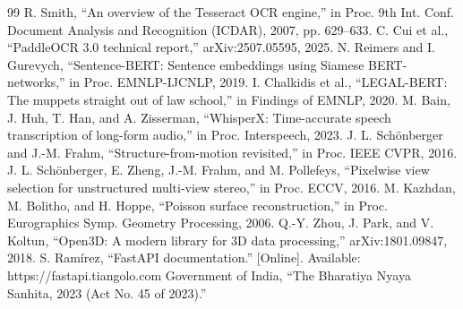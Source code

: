 \documentclass[12pt,a4paper,oneside]{report}
\begin{document}
\begin{thebibliography}{99}
 R. Smith, ``An overview of the Tesseract OCR engine,'' in Proc. 9th Int. Conf. Document Analysis and Recognition (ICDAR), 2007, pp. 629--633.
 C. Cui et al., ``PaddleOCR 3.0 technical report,'' arXiv:2507.05595, 2025.
 N. Reimers and I. Gurevych, ``Sentence-BERT: Sentence embeddings using Siamese BERT-networks,'' in Proc. EMNLP-IJCNLP, 2019.
 I. Chalkidis et al., ``LEGAL-BERT: The muppets straight out of law school,'' in Findings of EMNLP, 2020.
 M. Bain, J. Huh, T. Han, and A. Zisserman, ``WhisperX: Time-accurate speech transcription of long-form audio,'' in Proc. Interspeech, 2023.
 J. L. Schönberger and J.-M. Frahm, ``Structure-from-motion revisited,'' in Proc. IEEE CVPR, 2016.
 J. L. Schönberger, E. Zheng, J.-M. Frahm, and M. Pollefeys, ``Pixelwise view selection for unstructured multi-view stereo,'' in Proc. ECCV, 2016.
 M. Kazhdan, M. Bolitho, and H. Hoppe, ``Poisson surface reconstruction,'' in Proc. Eurographics Symp. Geometry Processing, 2006.
 Q.-Y. Zhou, J. Park, and V. Koltun, ``Open3D: A modern library for 3D data processing,'' arXiv:1801.09847, 2018.
 S. Ramírez, ``FastAPI documentation.'' [Online]. Available: https://fastapi.tiangolo.com
 Government of India, ``The Bharatiya Nyaya Sanhita, 2023 (Act No. 45 of 2023).''
\end{thebibliography}
\end{document}

